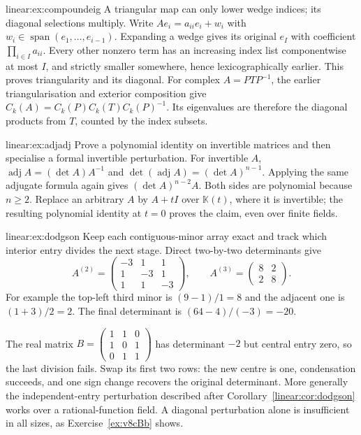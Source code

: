 \begin{solution}{linear:ex:compoundeig}
\idea A triangular map can only lower wedge indices; its diagonal selections multiply.
\writeup Write $Ae_i=a_{ii}e_i+w_i$ with $w_i\in\operatorname{span}(e_1,\ldots,e_{i-1})$. Expanding a wedge gives its original $e_I$ with coefficient $\prod_{i\in I}a_{ii}$. Every other nonzero term has an increasing index list componentwise at most $I$, and strictly smaller somewhere, hence lexicographically earlier. This proves triangularity and its diagonal. For complex $A=PTP^{-1}$, the earlier triangularisation and exterior composition give $C_k(A)=C_k(P)C_k(T)C_k(P)^{-1}$. Its eigenvalues are therefore the diagonal products from $T$, counted by the index subsets.
\end{solution}
\begin{solution}{linear:ex:adjadj}
\idea Prove a polynomial identity on invertible matrices and then specialise a formal invertible perturbation.
\writeup For invertible $A$, $\operatorname{adj}A=(\det A)A^{-1}$ and $\det(\operatorname{adj}A)=(\det A)^{n-1}$. Applying the same adjugate formula again gives $(\det A)^{n-2}A$. Both sides are polynomial because $n\ge2$. Replace an arbitrary $A$ by $A+tI$ over $\mathbb K(t)$, where it is invertible; the resulting polynomial identity at $t=0$ proves the claim, even over finite fields.
\end{solution}
\begin{solution}{linear:ex:dodgson}
\idea Keep each contiguous-minor array exact and track which interior entry divides the next stage.
\writeup Direct two-by-two determinants give
\[A^{(2)}=\begin{pmatrix}-3&1&1\\1&-3&1\\1&1&-3\end{pmatrix},\qquad
A^{(3)}=\begin{pmatrix}8&2\\2&8\end{pmatrix}.
\]
For example the top-left third minor is $(9-1)/1=8$ and the adjacent one is $(1+3)/2=2$. The final determinant is $(64-4)/(-3)=-20$.

The real matrix $B=\begin{pmatrix}1&1&0\\1&0&1\\0&1&1\end{pmatrix}$ has determinant $-2$ but central entry zero, so the last division fails. Swap its first two rows: the new centre is one, condensation succeeds, and one sign change recovers the original determinant. More generally the independent-entry perturbation described after Corollary~\ref{linear:cor:dodgson} works over a rational-function field. A diagonal perturbation alone is insufficient in all sizes, as Exercise~\ref{ex:v8cBb} shows.
\end{solution}
